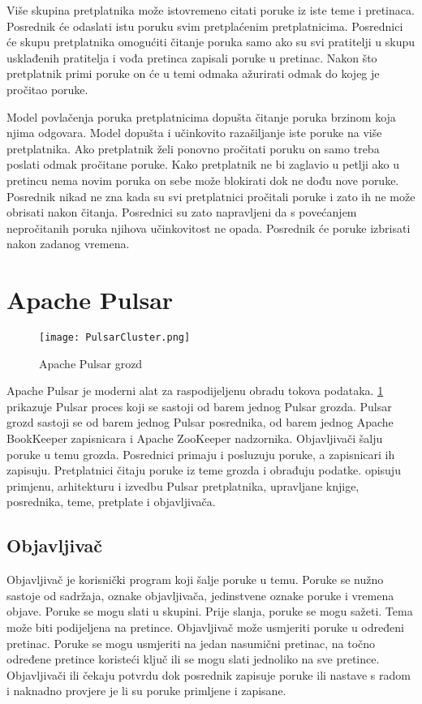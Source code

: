 \documentclass[times, utf8, diplomski, numeric]{fer}
\begin{document}
Više skupina pretplatnika može istovremeno citati poruke iz iste teme i pretinaca. Posrednik će odaslati istu poruku svim pretplaćenim pretplatnicima. Posrednici će skupu pretplatnika omogućiti čitanje poruka samo ako su svi pratitelji u skupu usklađenih pratitelja i vođa pretinca zapisali poruke u pretinac. Nakon što pretplatnik primi poruke on će u temi odmaka ažurirati odmak do kojeg je pročitao poruke.

Model povlačenja poruka pretplatnicima dopušta čitanje poruka brzinom koja njima odgovara. Model dopušta i učinkovito razašiljanje iste poruke na više pretplatnika. Ako pretplatnik želi ponovno pročitati poruku on samo treba poslati odmak pročitane poruke. Kako pretplatnik ne bi zaglavio u petlji ako u pretincu nema novim poruka on sebe može blokirati dok ne dođu nove poruke. Posrednik nikad ne zna kada su svi pretplatnici pročitali poruke i zato ih ne može obrisati nakon čitanja. Posrednici su zato napravljeni da s povećanjem nepročitanih poruka njihova učinkovitost ne opada. Posrednik će poruke izbrisati nakon zadanog vremena.

\section{Apache Pulsar}

\begin{figure}[H]
    \centering
    \texttt{[image: PulsarCluster.png]}
    \caption{Apache Pulsar grozd}
    \label{fig:pulsar-cluster}
\end{figure}

Apache Pulsar je moderni alat za raspodijeljenu obradu tokova podataka. \ref{fig:pulsar-cluster} prikazuje Pulsar proces koji se sastoji od barem jednog Pulsar grozda. Pulsar grozd sastoji se od barem jednog Pulsar posrednika, od barem jednog Apache BookKeeper zapisnicara i Apache ZooKeeper nadzornika. Objavljivači šalju poruke u temu grozda. Posrednici primaju i posluzuju poruke, a zapisnicari ih zapisuju. Pretplatnici čitaju poruke iz teme grozda i obrađuju podatke. \citep{pulsar-docs} \citep{pulsar-streamlio-1} \citep{pulsar-streamlio-2} \citep{pulsar-streamlio-intro} opisuju primjenu, arhitekturu i izvedbu Pulsar pretplatnika, upravljane knjige, posrednika, teme, pretplate i objavljivača.

\subsection{Objavljivač}
Objavljivač je korisnički program koji šalje poruke u temu. Poruke se nužno sastoje od sadržaja, oznake objavljivača, jedinstvene oznake poruke i vremena objave. Poruke se mogu slati u skupini. Prije slanja, poruke se mogu sažeti. Tema može biti podijeljena na pretince. Objavljivač može usmjeriti poruke u određeni pretinac. Poruke se mogu usmjeriti na jedan nasumični pretinac, na točno određene pretince koristeći ključ ili se mogu slati jednoliko na sve pretince. Objavljivači ili čekaju potvrdu dok posrednik zapisuje poruke ili nastave s radom i naknadno provjere je li su poruke primljene i zapisane.
\end{document}
